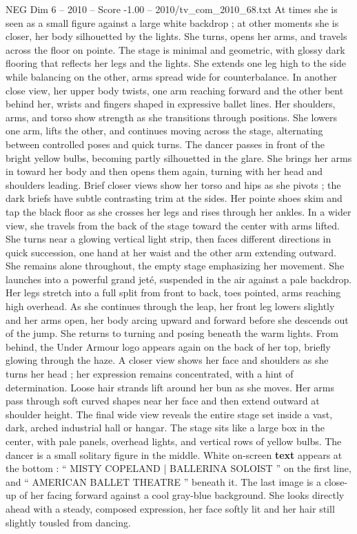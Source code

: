 \begin{textsample}{NEG Dim 6 – 2010 – Score -1.00 – 2010/tv\_com\_2010\_68.txt}
At times she is seen as a small figure against a large white backdrop ; at other moments she is closer, her body silhouetted by the lights.
She turns, opens her arms, and travels across the floor on pointe.
The stage is minimal and geometric, with glossy dark flooring that reflects her legs and the lights.
She extends one leg high to the side while balancing on the other, arms spread wide for counterbalance.
In another close view, her upper body twists, one arm reaching forward and the other bent behind her, wrists and fingers shaped in expressive ballet lines.
Her shoulders, arms, and torso show strength as she transitions through positions.
She lowers one arm, lifts the other, and continues moving across the stage, alternating between controlled poses and quick turns.
The dancer passes in front of the bright yellow bulbs, becoming partly silhouetted in the glare.
She brings her arms in toward her body and then opens them again, turning with her head and shoulders leading.
Brief closer views show her torso and hips as she pivots ; the dark briefs have subtle contrasting trim at the sides.
Her pointe shoes skim and tap the black floor as she crosses her legs and rises through her ankles.
In a wider view, she travels from the back of the stage toward the center with arms lifted.
She turns near a glowing vertical light strip, then faces different directions in quick succession, one hand at her waist and the other arm extending outward.
She remains alone throughout, the empty stage emphasizing her movement.
She launches into a powerful grand jeté, suspended in the air against a pale backdrop.
Her legs stretch into a full split from front to back, toes pointed, arms reaching high overhead.
As she continues through the leap, her front leg lowers slightly and her arms open, her body arcing upward and forward before she descends out of the jump.
She returns to turning and posing beneath the warm lights.
From behind, the Under Armour logo appears again on the back of her top, briefly glowing through the haze.
A closer view shows her face and shoulders as she turns her head ; her expression remains concentrated, with a hint of determination.
Loose hair strands lift around her bun as she moves.
Her arms pass through soft curved shapes near her face and then extend outward at shoulder height.
The final wide view reveals the entire stage set inside a vast, dark, arched industrial hall or hangar.
The stage sits like a large box in the center, with pale panels, overhead lights, and vertical rows of yellow bulbs.
The dancer is a small solitary figure in the middle.
White on-screen \textbf{text} appears at the bottom : “ MISTY COPELAND | BALLERINA SOLOIST ” on the first line, and “ AMERICAN BALLET THEATRE ” beneath it.
The last image is a close-up of her facing forward against a cool gray-blue background.
She looks directly ahead with a steady, composed expression, her face softly lit and her hair still slightly tousled from dancing.

\end{textsample}
